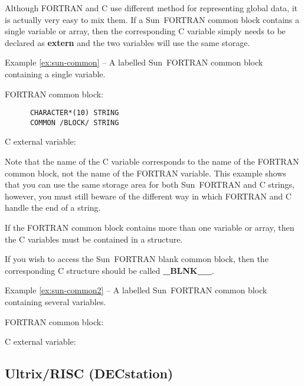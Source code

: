 Although FORTRAN and C use different method for representing global data, it is
actually very easy to mix them. If a Sun~FORTRAN common block contains a single
variable or array, then the corresponding C variable simply needs to be
declared as {\bf extern} and the two variables will use the same storage.

\label{ex:sun-common}
\begin{center}
Example \ref{ex:sun-common} -- A labelled Sun~FORTRAN common block containing a
single variable.
\end{center}
\nopagebreak[4]
FORTRAN common block:
{\small \begin{verbatim}
      CHARACTER*(10) STRING
      COMMON /BLOCK/ STRING
\end{verbatim} }

C external variable:

Note that the name of the C variable corresponds to the name of the FORTRAN
common block, not the name of the FORTRAN variable. This example shows that you
can use the same storage area for both Sun~FORTRAN and C strings, however, you must
still beware of the different way in which FORTRAN and C handle the end of
a string.

If the FORTRAN common block contains more than one variable or array, then the 
C variables must be contained in a structure.

If you wish to access the Sun~FORTRAN blank common block, then the corresponding C
structure should be called {\bf \_BLNK\_\_}.

\label{ex:sun-common2}
\begin{center}
Example \ref{ex:sun-common2} -- A labelled Sun~FORTRAN common block containing
several variables.
\end{center}
\nopagebreak[4]
FORTRAN common block:

C external variable:

\subsection{Ultrix/RISC (DECstation)}

